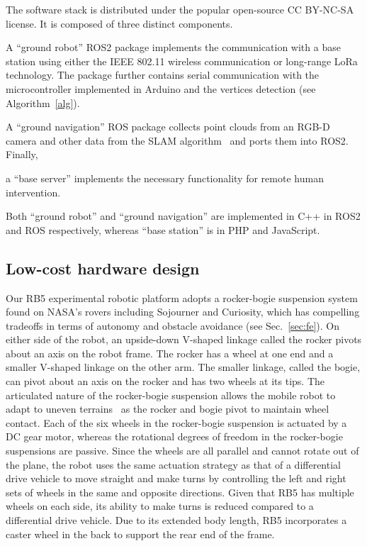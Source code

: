 \documentclass[letterpaper,10pt,conference,twoside]{IEEEtran}
\makeatletter
\theoremstyle{definition}
\newcommand\footnoteref[1]{\protected@xdef\@thefnmark{\ref{#1}}\@footnotemark}
\makeatother
\begin{document}
The %
software stack 
is distributed under the popular open-source CC BY-NC-SA license\footnoteref{link}. %
It is composed of three distinct components. 
\begin{enumerate*}[label={(\roman*)},font={\textit}]
  \item A ``ground robot'' ROS2 %
package implements the communication with a base station using either the IEEE 802.11 wireless communication or long-range LoRa technology. The package further %
contains serial communication with the microcontroller implemented in Arduino and the vertices detection (see Algorithm~\ref{alg}). 
  \item A ``ground navigation'' ROS package collects point clouds from an RGB-D camera %
and other data from the SLAM algorithm~\cite{labbe2019rtab} and ports them into ROS2. Finally, 
  \item a ``base server'' implements the necessary functionality for remote human intervention.
\end{enumerate*}
Both ``ground robot'' and ``ground navigation'' are implemented in C++ in ROS2 and ROS respectively, whereas ``base station'' is in PHP and JavaScript.

\subsection{Low-cost %
hardware design}
\label{sec:md}
\noindent
Our RB5 experimental robotic platform %
adopts a rocker-bogie suspension system~\cite{bickler1989articulated} found on NASA's rovers including Sojourner and Curiosity, which has compelling tradeoffs in terms of autonomy and obstacle avoidance (see Sec.~\ref{sec:fe}). On either side of the robot, an upside-down V-shaped linkage called the rocker pivots about an axis on the robot frame. The rocker has a wheel at one end and a smaller V-shaped linkage on the other arm. The smaller linkage, called the bogie, can pivot about an axis on the rocker and has two wheels at its tips. The articulated nature of the rocker-bogie suspension allows the mobile robot to adapt to uneven terrains~\cite{%
faisal2021low} as the rocker and bogie pivot to maintain wheel contact. %
%
Each of the six wheels in the rocker-bogie suspension is actuated by a DC gear motor, whereas the rotational degrees of freedom in the rocker-bogie suspensions are passive. Since the wheels are all parallel and cannot rotate out of the plane, the robot uses the same actuation strategy as that of a differential drive vehicle to move straight and make turns by controlling the left and right sets of wheels in the same and opposite directions. Given that RB5 has multiple wheels on each side, its ability to make turns is reduced compared to a differential drive vehicle. Due to its extended body length, RB5 incorporates a caster wheel in the back to support the rear end of the frame.
\end{document}
